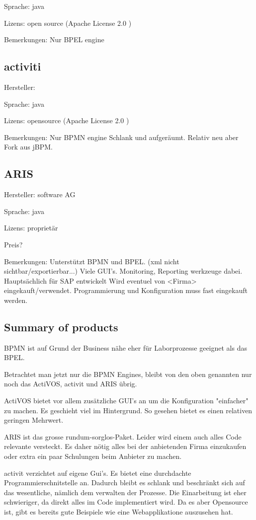 \documentclass[paper=a4,twoside=false,BCOR=0mm,DIV=calc,fontsize=12pt]{scrartcl}
\begin{document}
Sprache: java

Lizens: open source (Apache License 2.0 )

Bemerkungen:
Nur BPEL engine



\subsection{activiti}
Hersteller:

Sprache: java

Lizens: opensource (Apache License 2.0 )


Bemerkungen:
Nur BPMN engine
Schlank und aufgeräumt. 
Relativ neu aber Fork aus jBPM.


\subsection{ARIS}
Hersteller: software AG

Sprache: java

Lizens: proprietär

Preis?

Bemerkungen:
Unterstützt BPMN und BPEL. (xml nicht sichtbar/exportierbar...)
Viele GUI's. 
Monitoring, Reporting werkzeuge dabei.
Hauptsächlich für SAP entwickelt
Wird eventuel von <Firma> eingekauft/verwendet.
Programmierung und Konfiguration muss fast eingekauft werden.



\subsection{Summary of products}
BPMN ist auf Grund der Business nähe eher für Laborprozesse geeignet als das BPEL.

Betrachtet man jetzt nur die BPMN Engines, bleibt von den oben genannten nur noch das ActiVOS, activit und ARIS übrig.

ActiVOS bietet vor allem zusätzliche GUI's an um die Konfiguration "einfacher" zu machen. Es geschieht viel im Hintergrund. 
So gesehen bietet es einen relativen geringen Mehrwert. 

ARIS ist das grosse rundum-sorglos-Paket. Leider wird einem auch alles Code relevante versteckt. Es daher nötig alles bei der anbietenden
Firma einzukaufen oder extra ein paar Schulungen beim Anbieter zu machen.

activit verzichtet auf eigene Gui's. Es bietet eine durchdachte Programmierschnitstelle an. Dadurch bleibt es schlank und beschränkt sich
auf das wesentliche, nämlich dem verwalten der Prozesse. Die Einarbeitung ist eher schwieriger, da direkt alles im Code implementiert wird.
Da es aber Opensource ist, gibt es bereits gute Beispiele wie eine Webapplikatione auszusehen hat.
\end{document}
